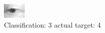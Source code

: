 \begin{figure}[h!]
\begin{center}
\includegraphics[width=0.60\columnwidth]{figures/ID2710_class_3_target_4.png}
\end{center}
\caption{ Classification: 3 actual target: 4}
\label{fig:ID2710_class_3_target_4}
\end{figure}
